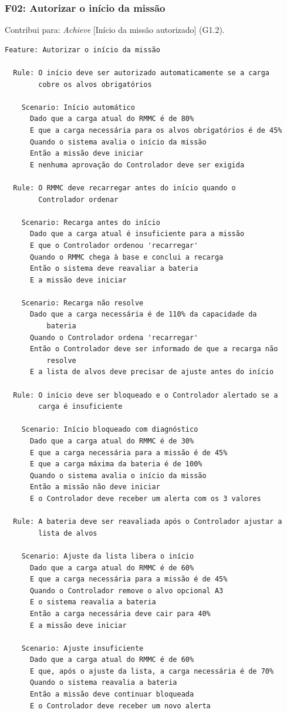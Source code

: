 \documentclass[a4paper, 12pt]{article}
\begin{document}
\Needspace{8cm}
\subsubsection{F02: Autorizar o início da missão}

Contribui para: \textit{Achieve} [Início da missão autorizado] (G1.2).

{\small
\begin{verbatim}
Feature: Autorizar o início da missão

  Rule: O início deve ser autorizado automaticamente se a carga
        cobre os alvos obrigatórios

    Scenario: Início automático
      Dado que a carga atual do RMMC é de 80%
      E que a carga necessária para os alvos obrigatórios é de 45%
      Quando o sistema avalia o início da missão
      Então a missão deve iniciar
      E nenhuma aprovação do Controlador deve ser exigida

  Rule: O RMMC deve recarregar antes do início quando o
        Controlador ordenar

    Scenario: Recarga antes do início
      Dado que a carga atual é insuficiente para a missão
      E que o Controlador ordenou 'recarregar'
      Quando o RMMC chega à base e conclui a recarga
      Então o sistema deve reavaliar a bateria
      E a missão deve iniciar

    Scenario: Recarga não resolve
      Dado que a carga necessária é de 110% da capacidade da
          bateria
      Quando o Controlador ordena 'recarregar'
      Então o Controlador deve ser informado de que a recarga não
          resolve
      E a lista de alvos deve precisar de ajuste antes do início

  Rule: O início deve ser bloqueado e o Controlador alertado se a
        carga é insuficiente

    Scenario: Início bloqueado com diagnóstico
      Dado que a carga atual do RMMC é de 30%
      E que a carga necessária para a missão é de 45%
      E que a carga máxima da bateria é de 100%
      Quando o sistema avalia o início da missão
      Então a missão não deve iniciar
      E o Controlador deve receber um alerta com os 3 valores

  Rule: A bateria deve ser reavaliada após o Controlador ajustar a
        lista de alvos

    Scenario: Ajuste da lista libera o início
      Dado que a carga atual do RMMC é de 60%
      E que a carga necessária para a missão é de 45%
      Quando o Controlador remove o alvo opcional A3
      E o sistema reavalia a bateria
      Então a carga necessária deve cair para 40%
      E a missão deve iniciar

    Scenario: Ajuste insuficiente
      Dado que a carga atual do RMMC é de 60%
      E que, após o ajuste da lista, a carga necessária é de 70%
      Quando o sistema reavalia a bateria
      Então a missão deve continuar bloqueada
      E o Controlador deve receber um novo alerta
\end{verbatim}
}
\end{document}
